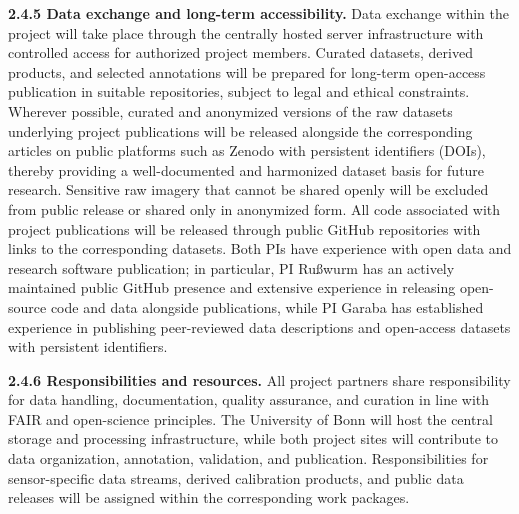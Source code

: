 \documentclass{scrartcl}
\begin{document}
\textbf{2.4.5 Data exchange and long-term accessibility.} Data exchange within the project will take place through the centrally hosted server infrastructure with controlled access for authorized project members. Curated datasets, derived products, and selected annotations will be prepared for long-term open-access publication in suitable repositories, subject to legal and ethical constraints. Wherever possible, curated and anonymized versions of the raw datasets underlying project publications will be released alongside the corresponding articles on public platforms such as Zenodo with persistent identifiers (DOIs), thereby providing a well-documented and harmonized dataset basis for future research. Sensitive raw imagery that cannot be shared openly will be excluded from public release or shared only in anonymized form. All code associated with project publications will be released through public GitHub repositories with links to the corresponding datasets. Both PIs have experience with open data and research software publication; in particular, PI Rußwurm has an actively maintained public GitHub presence and extensive experience in releasing open-source code and data alongside publications, while PI Garaba has established experience in publishing peer-reviewed data descriptions and open-access datasets with persistent identifiers.

\textbf{2.4.6 Responsibilities and resources.} All project partners share responsibility for data handling, documentation, quality assurance, and curation in line with FAIR and open-science principles. The University of Bonn will host the central storage and processing infrastructure, while both project sites will contribute to data organization, annotation, validation, and publication. Responsibilities for sensor-specific data streams, derived calibration products, and public data releases will be assigned within the corresponding work packages.
\end{document}

